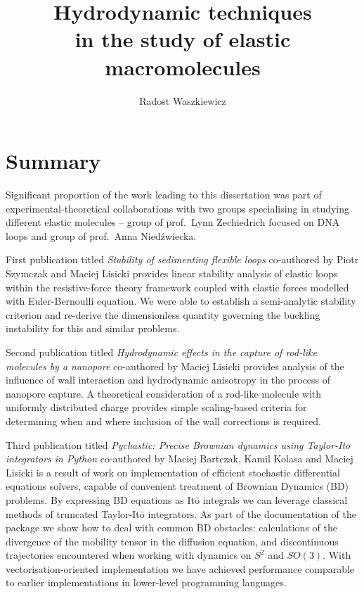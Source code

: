 \documentclass{doctoral}
\title{Hydrodynamic techniques\\in the study of elastic macromolecules}
\author{Radost Waszkiewicz}
\affiliation{University of Warsaw\\Faculty of Physics}
\newcommand{\code}[1]{\texttt{\detokenize{#1}}}
\begin{document}
\maketitle

\section*{Summary}
Significant proportion of the work leading to this dissertation was part of experimental-theoretical collaborations with two groups specialising in studying different elastic molecules -- group of prof.~Lynn Zechiedrich focused on DNA loops and group of prof.~Anna Niedźwiecka.

First publication titled \emph{Stability of sedimenting flexible loops} co-authored by Piotr Szymczak and Maciej Lisicki provides linear stability analysis of elastic loops within the resistive-force theory framework coupled with elastic forces modelled with Euler-Bernoulli equation.
We were able to establish a semi-analytic stability criterion and re-derive the dimensionless quantity governing the buckling instability for this and similar problems.

Second publication titled \emph{Hydrodynamic effects in the capture of rod-like molecules by a nanopore} co-authored by Maciej Lisicki provides analysis of the influence of wall interaction and hydrodynamic anisotropy in the process of nanopore capture.
A theoretical consideration of a rod-like molecule with uniformly distributed charge provides simple scaling-based criteria for determining when and where inclusion of the wall corrections is required.

Third publication titled \emph{Pychastic: Precise Brownian dynamics using Taylor-Ito integrators in Python} co-authored by Maciej Bartczak, Kamil Kolasa and Maciej Lisicki is a result of work on implementation of efficient stochastic differential equations solvers, capable of convenient treatment of Brownian Dynamics (BD) problems.
By expressing BD equations as Itō integrals we can leverage classical methods of truncated Taylor-Itō integrators.
As part of the documentation of the \code{pychastic} package we show how to deal with common BD obstacles: calculations of the divergence of the mobility tensor in the diffusion equation, and discontinuous trajectories encountered when working with dynamics on $S^2$ and $SO(3)$.
With vectorisation-oriented implementation we have achieved performance comparable to earlier implementations in lower-level programming languages.
\end{document}
